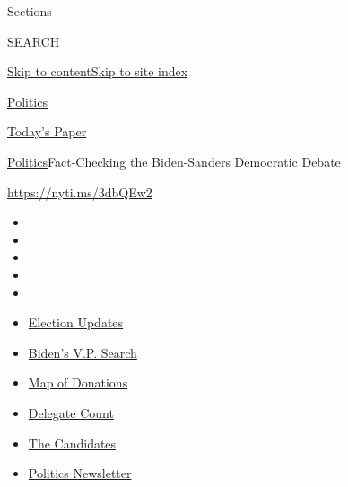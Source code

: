 Sections

SEARCH

\protect\hyperlink{site-content}{Skip to
content}\protect\hyperlink{site-index}{Skip to site index}

\href{https://www.nytimes.com/section/politics}{Politics}

\href{https://myaccount.nytimes.com/auth/login?response_type=cookie\&client_id=vi}{}

\href{https://www.nytimes.com/section/todayspaper}{Today's Paper}

\href{/section/politics}{Politics}\textbar{}Fact-Checking the
Biden-Sanders Democratic Debate

\url{https://nyti.ms/3dbQEw2}

\begin{itemize}
\item
\item
\item
\item
\item
\end{itemize}

\begin{itemize}
\item
  \href{https://www.nytimes.com/2020/07/31/us/elections/biden-vs-trump.html?action=click\&pgtype=Article\&state=default\&region=TOP_BANNER\&context=storylines_menu}{Election
  Updates}
\item
  \href{https://www.nytimes.com/article/biden-vice-president-2020.html?action=click\&pgtype=Article\&state=default\&region=TOP_BANNER\&context=storylines_menu}{Biden's
  V.P. Search}
\item
  \href{https://www.nytimes.com/interactive/2020/07/24/us/politics/trump-biden-campaign-donors.html?action=click\&pgtype=Article\&state=default\&region=TOP_BANNER\&context=storylines_menu}{Map
  of Donations}
\item
  \href{https://www.nytimes.com/interactive/2020/us/elections/delegate-count-primary-results.html?action=click\&pgtype=Article\&state=default\&region=TOP_BANNER\&context=storylines_menu}{Delegate
  Count}
\item
  \href{https://www.nytimes.com/interactive/2019/us/politics/2020-presidential-candidates.html?action=click\&pgtype=Article\&state=default\&region=TOP_BANNER\&context=storylines_menu}{The
  Candidates}
\item
  \href{https://www.nytimes.com/newsletters/politics?action=click\&pgtype=Article\&state=default\&region=TOP_BANNER\&context=storylines_menu}{Politics
  Newsletter}
\end{itemize}

